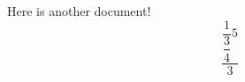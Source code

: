 \documentclass{article}
\begin{document}
Here is another document!
\[\dfrac{\dfrac{1}{\dfrac{3}{4}}{5}}{3}\]
\end{document}
